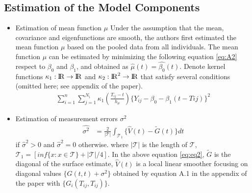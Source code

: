 \documentclass[11pt]{report}
\begin{document}
\subsection*{Estimation of the Model Components}
\begin{itemize}
	\item{Estimation of mean function $\mu$}
	Under the assumption that the mean, covariance and eigenfunctions are smooth, the authors first estimated the mean function $\mu$ based on the pooled data from all individuals.
	The mean function $\mu$ can be estimated by minimizing the following equation \eqref{eq:A2} respect to $\beta_0$ and $\beta_1$, and obtained as $\hat{\mu}(t) = \hat{\beta_0}(t)$.
	Denote kernel functions $\kappa_1: {\rm I\!R} \rightarrow {\rm I\!R} $ and $\kappa_2: {\rm I\!R}^2 \rightarrow {\rm I\!R} $ that satisfy several conditions (omitted here; see appendix of the paper).
	\begin{align}
		\label{eq:A2}
		\sum_{i=1}^{n}\sum_{j=1}^{N_i}\kappa_1(\frac{T_{ij}-t}{h_\mu})\{Y_{ij}-\beta_0-\beta_1(t-T{ij})\}^2{}
	\end{align}



	\item{Estimation of measurement errors $\sigma^2$}
	\begin{align}
	    \label{eq:eq2}
	    \hat{\sigma^2} &= \frac{2}{|\mathcal{T}|}\int_{\mathcal{T}_1}\{\hat{V}(t) - \tilde{G}(t)\}dt 
	\end{align}
	if $\hat{\sigma}^2>0$ and $\hat{\sigma}^2 = 0$ otherwise.
	where $|\mathcal{T}|$ is the length of $\mathcal{T}$, $\mathcal{T_1} = [inf\{x: x \in \mathcal{T}\} + |\mathcal{T}|/4]$.
	In the above equation \eqref{eq:eq2}, $\tilde{G}$ is the diagonal of the surface estimate, $\hat{V}(t)$ is a local linear smoother focusing on diagonal values $\{G(t,t) + \sigma^2\}$ obtained by equation A.1 in the appendix of the paper with $\{G_i(T_{ij}, T_{ij})\}$.



\end{itemize}
\end{document}
